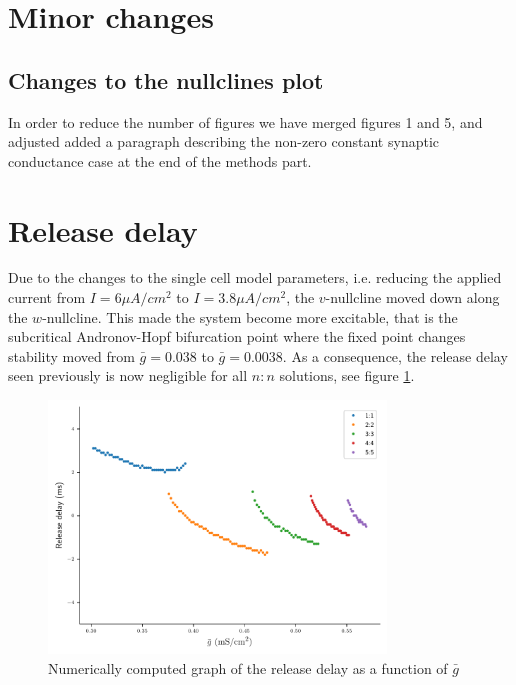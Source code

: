 \documentclass[utf8]{frontiers_suppmat} %
\begin{document}
\onecolumn
{}

\title[Response]{{}}
\maketitle

\section{Minor changes}
\subsection{Changes to the nullclines plot}
In order to reduce the number of figures we have merged figures 1 and 5, and adjusted added a paragraph describing the non-zero constant synaptic conductance case at the end of the methods part.

\section{Release delay}
Due to the changes to the single cell model parameters, i.e. reducing the applied current from $I=6 \si{\mu A/cm^{2}}$ to $I=3.8\si{\mu A/cm^{2}}$, the $v$-nullcline moved down along the $w$-nullcline.
This made the system become more excitable, that is the subcritical Andronov-Hopf bifurcation point where the fixed point changes stability moved from $\bar g=0.038$ to $\bar g=0.0038$.
As a consequence, the release delay seen previously is now negligible for all $n:n$ solutions, see figure \cref{fig:release-delay}.

\begin{figure}[h!]
  \centering
  \includegraphics[width=0.8\textwidth]{release-delay.pdf}
  \caption{Numerically computed graph of the release delay as a function of $\bar g$~\label{fig:release-delay}}
\end{figure}



\end{document}
